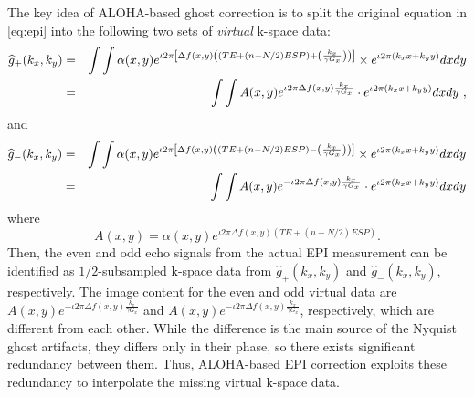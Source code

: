 \documentclass[num-refs]{wiley-article}
\newcommand{\0}{{\boldsymbol{0}}}
\newcommand{\1}{\blmath{1}}
\begin{document}
	
	The key idea of ALOHA-based ghost correction \cite{Lee2016reference} is to split the original equation in  \eqref{eq:epi} into the following two sets of {\em virtual} k-space data:
	\begin{eqnarray}
	\widehat g_{+}(k_x,k_y) 
	&=&\int\int \alpha(x,y)e^{\iota 2\pi \left[ \Delta f(x,y) \left( \left( TE+ (n-N/2)ESP \right) + \left( \frac{k_x}{\gamma G_x} \right) \right) \right]}\times e^{\iota 2\pi (k_x x+k_y y)} dxdy \notag\\
	&=&\int\int   A(x,y) e^{ \iota 2\pi \Delta f(x,y)\frac{k_x}{\gamma G_x} } \cdot e^{\iota 2\pi\left(k_x x+k_y y\right)} dxdy \notag  \ ,
	\end{eqnarray}
	and 
	\begin{eqnarray*}
		\widehat g_{-}(k_x,k_y)
		&=&\int\int \alpha(x,y)e^{\iota 2\pi \left[ \Delta f(x,y) \left( \left( TE+ (n-N/2)ESP \right) - \left( \frac{k_x}{\gamma G_x} \right) \right) \right]} \times e^{\iota 2\pi (k_x x+k_y y)} dxdy \notag\\
		&=&\int\int   A(x,y) e^{-\iota 2\pi \Delta f(x,y)\frac{k_x}{\gamma G_x} } \cdot e^{\iota 2\pi\left(k_x x+k_y y\right)} dxdy
	\end{eqnarray*}
	where $$A(x,y) = \alpha(x,y)e^{\iota 2\pi \Delta f(x,y) (TE+ (n-N/2)ESP )}.$$
	Then,  the even and odd echo signals from the actual EPI measurement can be identified as $1/2$-subsampled k-space data from $\widehat g_{+}(k_x,k_y)$ and $\widehat g_{-}(k_x,k_y)$, respectively.
	The image content for the even and odd virtual data are $A(x,y) e^{+\iota 2\pi \Delta f(x,y)\frac{k_x}{\gamma G_x}}$ and 
	$A(x,y)e^{-\iota 2\pi \Delta f(x,y)\frac{k_x}{\gamma G_x} }$, respectively, which are different from each other. While the difference is the main source of the Nyquist ghost artifacts, they differs only in their phase, so there exists significant redundancy between them.
	Thus, ALOHA-based EPI correction \cite{Lee2016reference} exploits these redundancy to interpolate 
	the missing virtual k-space data.
	
	
	
\end{document}
